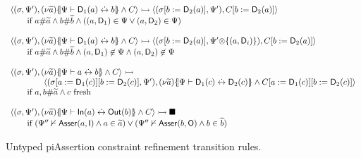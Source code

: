 \documentclass[11pt,a4paper]{article}
\theoremstyle{definition}
\begin{document}
\begin{figure}[t!]
\[\begin{array}{l}
\langle (\sigma, \Psi'), (\nu\ve{a})\constr{\Psi\vdash \mathsf{D}_1(a) \sch b} \land C \rangle
\rightarrowtail
\langle (\sigma[b:=\mathsf{D}_2(a)], \Psi') , C[b:=\mathsf{D}_2(a)] \rangle \\
\qquad\text{if } a \freshin \ve{a} \land b \freshin \ve{b} \land
((a,\mathsf{D}_1)\in\Psi \lor (a,\mathsf{D}_2)\in\Psi)
\\ \\
\langle (\sigma, \Psi'), (\nu\ve{a})\constr{\Psi\vdash \mathsf{D}_1(a) \sch b} \land C \rangle
\rightarrowtail
\langle (\sigma[b:=\mathsf{D}_2(a)], \Psi' \ftimes \{(a,\mathsf{D}_i)\}) , C[b:=\mathsf{D}_2(a)] \rangle \\
\qquad\text{if } a \freshin \ve{a} \land b \freshin \ve{b} \land
(a,\mathsf{D}_1)\not\in\Psi \land (a,\mathsf{D}_2)\not\in\Psi
\\ \\
\langle (\sigma, \Psi'), (\nu\ve{a})\constr{\Psi\vdash a \sch b} \land C \rangle
\rightarrowtail\\\qquad\qquad
\langle (\sigma[a:=\mathsf{D}_1(c)][b:=\mathsf{D}_2(c)], \Psi') , 
(\nu\ve{a})\constr{\Psi\vdash \mathsf{D}_1(c)  \sch \mathsf{D}_2(c)} \land C[a:=\mathsf{D}_1(c)][b:=\mathsf{D}_2(c)] \rangle \\
\qquad\text{if }  a,b\freshin\ve{a} \land c \text{~fresh}
\\ \\
\langle (\sigma, \Psi'), (\nu\ve{a})\constr{\Psi\vdash \mathsf{In}(a) \sch \mathsf{Out}(b)} \land C \rangle
\rightarrowtail
\blacksquare \\
\qquad\text{if } (\Psi'' \nvdash \mathsf{Asser}(a,\mathsf{I})  \land a \in \ve{a}) \lor (\Psi'' \nvdash \mathsf{Asser}(b,\mathsf{O}) \land b \in
  \ve{b})
\\
\end{array}
\]
\caption%
{Untyped piAssertion constraint refinement transition rules. 
}
\label{piAssertion rules:rules}
\end{figure}
\end{document}
